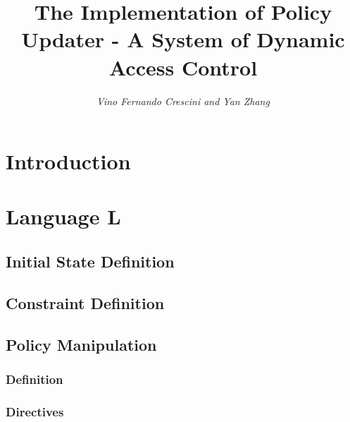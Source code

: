 \documentclass{llncs}
\begin{document}
  \long{}

  \title{The Implementation of Policy Updater - A System of Dynamic Access Control}

  \author{\em Vino Fernando Crescini and Yan Zhang}


  \maketitle

  \begin{abstract}
  \end{abstract}

  \section{Introduction}

  \section{Language L}

    \subsection{Initial State Definition}

    \subsection{Constraint Definition}

    \subsection{Policy Manipulation}

      \subsubsection{Definition}

      \subsubsection{Directives}
\end{document}
